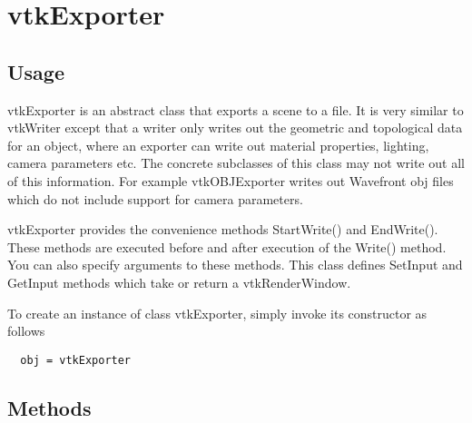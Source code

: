 \section{vtkExporter}

\subsection{Usage}

 vtkExporter is an abstract class that exports a scene to a file. It
 is very similar to vtkWriter except that a writer only writes out
 the geometric and topological data for an object, where an exporter
 can write out material properties, lighting, camera parameters etc.
 The concrete subclasses of this class may not write out all of this
 information. For example vtkOBJExporter writes out Wavefront obj files
 which do not include support for camera parameters.

 vtkExporter provides the convenience methods StartWrite() and EndWrite().
 These methods are executed before and after execution of the Write() 
 method. You can also specify arguments to these methods.
 This class defines SetInput and GetInput methods which take or return
 a vtkRenderWindow.  

To create an instance of class vtkExporter, simply
invoke its constructor as follows
\begin{verbatim}
  obj = vtkExporter
\end{verbatim}
\subsection{Methods}

